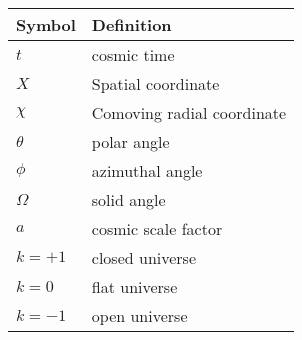 \begin{tabular}{ll}
 \toprule
  Symbol & Definition \\
 \midrule
 \midrule
  \(t\) & cosmic time \\
  \(X\) & Spatial coordinate \\
  \(\chi\) & Comoving radial coordinate \\
  \(\theta\) & polar angle \\
  \(\phi\) & azimuthal angle \\
  \(\Omega\) & solid angle \\
  \(a\) & cosmic scale factor \\
  \(k=+1\) & closed universe \\
  \(k=0\) & flat universe \\
  \(k=-1\) & open universe \\
 \bottomrule
\end{tabular}
